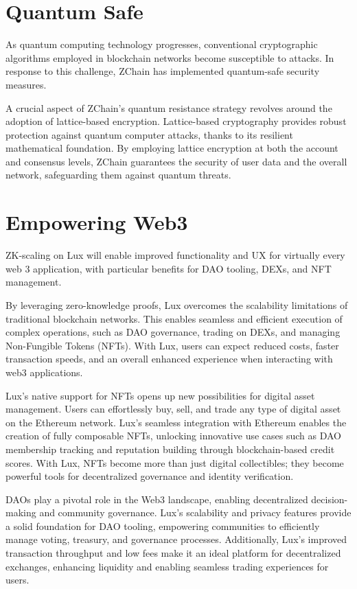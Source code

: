 \documentclass[11pt]{article}
\begin{document}
\section{Quantum Safe}

As quantum computing technology progresses, conventional cryptographic algorithms employed in blockchain networks become susceptible to attacks. In response to this challenge, ZChain has implemented quantum-safe security measures.


A crucial aspect of ZChain's quantum resistance strategy revolves around the adoption of lattice-based encryption. Lattice-based cryptography provides robust protection against quantum computer attacks, thanks to its resilient mathematical foundation. By employing lattice encryption at both the account and consensus levels, ZChain guarantees the security of user data and the overall network, safeguarding them against quantum threats.


\section{Empowering Web3}

ZK-scaling on Lux will enable improved functionality and UX for virtually every web 3 application, with particular benefits for DAO tooling, DEXs, and NFT management.


By leveraging zero-knowledge proofs, Lux overcomes the scalability limitations of traditional blockchain networks. This enables seamless and efficient execution of complex operations, such as DAO governance, trading on DEXs, and managing Non-Fungible Tokens (NFTs). With Lux, users can expect reduced costs, faster transaction speeds, and an overall enhanced experience when interacting with web3 applications.


Lux's native support for NFTs opens up new possibilities for digital asset management. Users can effortlessly buy, sell, and trade any type of digital asset on the Ethereum network. Lux's seamless integration with Ethereum enables the creation of fully composable NFTs, unlocking innovative use cases such as DAO membership tracking and reputation building through blockchain-based credit scores. With Lux, NFTs become more than just digital collectibles; they become powerful tools for decentralized governance and identity verification.


DAOs play a pivotal role in the Web3 landscape, enabling decentralized decision-making and community governance. Lux's scalability and privacy features provide a solid foundation for DAO tooling, empowering communities to efficiently manage voting, treasury, and governance processes. Additionally, Lux's improved transaction throughput and low fees make it an ideal platform for decentralized exchanges, enhancing liquidity and enabling seamless trading experiences for users.
\end{document}
